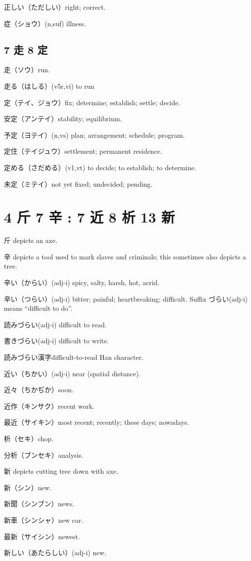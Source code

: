 正しい（ただしい）right; correct.

症（ショウ）(n,suf) illness.

\subsection{7 走 8 定}

走（ソウ）run.

走る（はしる）(v5r,vi) to run

定（テイ、ジョウ）fix; determine; establish; settle; decide.

安定（アンテイ）stability; equilibrium.

予定（ヨテイ）(n,vs) plan; arrangement; schedule; program.

定住（テイジュウ）settlement; permanent residence.

定める（さだめる）(v1,vt) to decide; to establish; to determine.

未定（ミテイ）not yet fixed; undecided; pending.

\section{4 斤 7 辛 : 7 近 8 析 13 新}

斤 depicts an axe.

辛 depicts a tool used to mark slaves and criminals;
this sometimes also depicts a tree.

辛い（からい）(adj-i) spicy, salty, harsh, hot, acrid.

辛い（つらい）(adj-i) bitter; painful; heartbreaking; difficult.
Suffix づらい(adj-i) means ``difficult to do''.

読みづらい(adj-i) difficult to read.

書きづらい(adj-i) difficult to write.

読みづらい漢字difficult-to-read Han character.

近い（ちかい）(adj-i) near (spatial distance).

近々（ちかぢか）soon.

近作（キンサク）recent work.

最近（サイキン）most recent; recently; these days; nowadays.

析（セキ）chop.

分析（ブンセキ）analysis.

新 depicts cutting tree down with axe.

新（シン）new.

新聞（シンブン）news.

新車（シンシャ）new car.

最新（サイシン）newest.

新しい（あたらしい）(adj-i) new.
